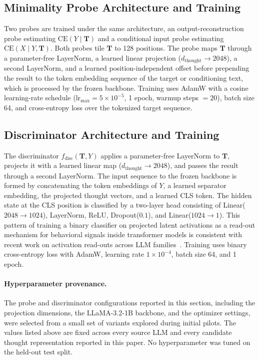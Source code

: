 \subsection{Minimality Probe Architecture and Training}
Two probes are trained under the same architecture, an output-reconstruction probe
estimating $\mathrm{CE}(Y \mid \mathbf{T})$ and a conditional input probe
estimating $\mathrm{CE}(X \mid Y, \mathbf{T})$.
Both probes tile $\mathbf{T}$ to 128 positions.
The probe maps $\mathbf{T}$ through a parameter-free LayerNorm, a learned linear
projection ($d_{\mathrm{thought}} \to 2048$), a second LayerNorm, and a learned
position-independent offset before prepending the result to the token embedding
sequence of the target or conditioning text, which is processed by the frozen backbone.
Training uses AdamW with a cosine learning-rate schedule
($\mathrm{lr}_{\max} = 5 \times 10^{-5}$, 1 epoch, warmup steps $= 20$),
batch size 64, and cross-entropy loss over the tokenized target sequence.

\subsection{Discriminator Architecture and Training}
\label{appendix:sub:disc_arch}
The discriminator $f_\mathrm{disc}(\mathbf{T}, Y)$ applies a parameter-free LayerNorm
to $\mathbf{T}$, projects it with a learned linear map ($d_{\mathrm{thought}} \to 2048$),
and passes the result through a second LayerNorm.
The input sequence to the frozen backbone is formed by concatenating the token embeddings
of $Y$, a learned separator embedding, the projected thought vectors, and a learned CLS
token.
The hidden state at the CLS position is classified by a two-layer head consisting of
Linear($2048 \to 1024$), LayerNorm, ReLU, Dropout($0.1$), and Linear($1024 \to 1$).
This pattern of training a binary classifier on projected latent
activations as a read-out mechanism for behavioral signals inside
transformer models is consistent with recent work on activation
read-outs across LLM families~\citep{zhan2026real}.
Training uses binary cross-entropy loss with AdamW,
learning rate $1 \times 10^{-4}$, batch size 64, and 1 epoch.

\paragraph{Hyperparameter provenance.} The probe and discriminator configurations reported in this section, including the projection dimensions, the LLaMA-3.2-1B backbone, and the optimizer settings, were selected from a small set of variants explored during initial pilots. The values listed above are fixed across every source LLM and every candidate thought representation reported in this paper. No hyperparameter was tuned on the held-out test split.


